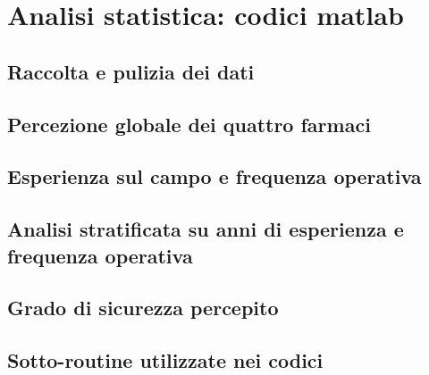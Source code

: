 \chapter{Analisi statistica: codici matlab}

\section{Raccolta e pulizia dei dati}
\label{code:wrangling}


\section{Percezione globale dei quattro farmaci}
\label{code:quality-global}


\section{Esperienza sul campo e frequenza operativa}
\label{code:seniorityVexperience}


\section{Analisi stratificata su anni di esperienza e frequenza operativa}
\label{code:quality-strati}


\section{Grado di sicurezza percepito}
\label{code:safety}


\newpage

\section{Sotto-routine utilizzate nei codici}
\label{code:subroutines}


